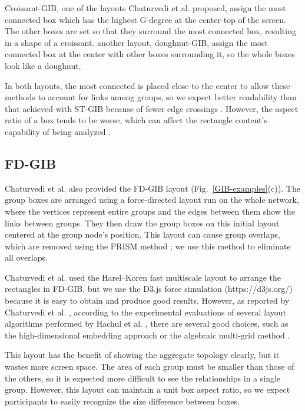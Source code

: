 \documentclass{vgtc}                          %
\begin{document}
Croissant-GIB, one of the layouts Chaturvedi et al. proposed, assign the most connected box which has the highest G-degree at the center-top of the screen. The other boxes are set so that they surround the most connected box, resulting in a shape of a croissant. another layout, doughnut-GIB, assign the most connected box at the center with other boxes surrounding it, so the whole boxes look like a doughnut.

In both layouts, the most connected is placed close to the center to allow these methods to account for links among groups, so we expect better readability than that achieved with ST-GIB because of fewer edge crossings \cite{468391,purchase1997aesthetic,purchase1998performance,purchase2002empirical}.
However, the aspect ratio of a box tends to be worse, which can affect the rectangle content's capability of being analyzed \cite{bruls2000squarified}.

\subsection{FD-GIB}
Chaturvedi et al. \cite{chaturvedi2014group} also provided the FD-GIB layout (Fig.~\ref{GIB-examples}(c)).
The group boxes are arranged using a force-directed layout run on the whole network, where the vertices represent entire groups and the edges between them show the links between groups.
They then draw the group boxes on this initial layout centered at the group node's position.
This layout can cause group overlaps, which are removed using the PRISM method \cite{gansner2008efficient}; we use this method to eliminate all overlaps.

Chaturvedi et al. used the Harel--Koren fast multiscale layout \cite{harel2002graph} to arrange the rectangles in FD-GIB, but we use the D3.js force simulation (https://d3js.org/) because it is easy to obtain and produce good results.
However, as reported by Chaturvedi et al. \cite{chaturvedi2014group}, according to the experimental evaluations of several layout algorithms performed by Hachul et al. \cite{Hachul:2005:ECF:2102325.2102348,Hachul2007LargeGraphLA}, there are several good choices, such as the high-dimensional embedding approach \cite{harel2002graph} or the algebraic multi-grid method \cite{koren2003drawing}.

This layout has the benefit of showing the aggregate topology clearly, but it wastes more screen space.
The area of each group must be smaller than those of the others, so it is expected more difficult to see the relationships in a single group.
However, this layout can maintain a unit box aspect ratio, so we expect participants to easily recognize the size difference between boxes.
\end{document}
